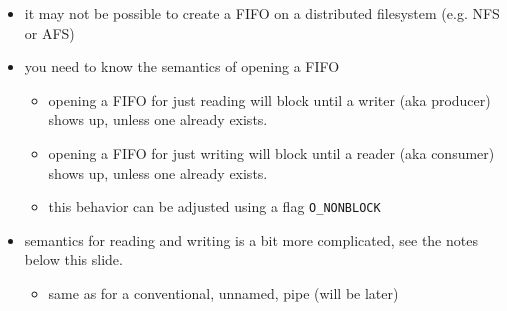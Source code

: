 \begin{slide}

\begin{itemize}
\item it may not be possible to create a FIFO on a distributed filesystem (e.g.
NFS or AFS)
\item you need to know the semantics of opening a FIFO
  \begin{itemize}
  \item opening a FIFO for just reading will block until a writer (aka producer)
  shows up, unless one already exists.
  \item opening a FIFO for just writing will block until a reader (aka consumer)
  shows up, unless one already exists.
  \item this behavior can be adjusted using a flag \texttt{O\_NONBLOCK}
  \end{itemize}
\item semantics for reading and writing is a bit more complicated, see
the notes below this slide.
  \begin{itemize}
  \item same as for a conventional, unnamed, pipe (will be later)
  \end{itemize}
\end{itemize}
\end{slide}



